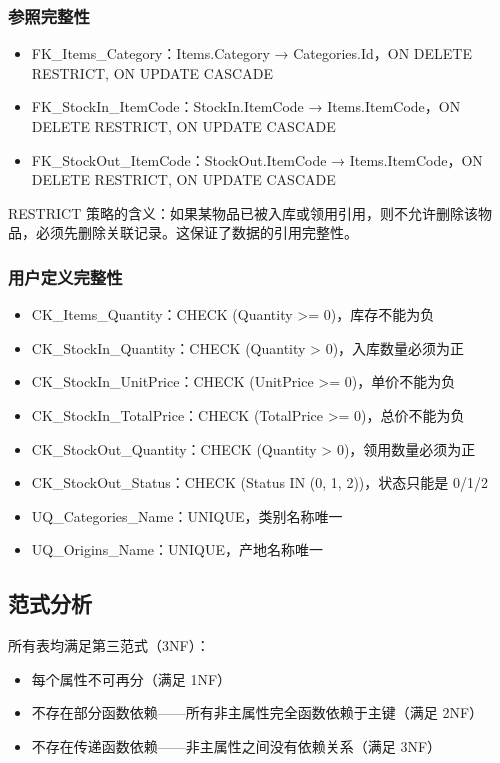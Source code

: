 \documentclass[12pt,a4paper]{ctexart}
\begin{document}
\subsubsection{参照完整性}

\begin{itemize}
    \item FK\_Items\_Category：Items.Category → Categories.Id，ON DELETE RESTRICT, ON UPDATE CASCADE
    \item FK\_StockIn\_ItemCode：StockIn.ItemCode → Items.ItemCode，ON DELETE RESTRICT, ON UPDATE CASCADE
    \item FK\_StockOut\_ItemCode：StockOut.ItemCode → Items.ItemCode，ON DELETE RESTRICT, ON UPDATE CASCADE
\end{itemize}

RESTRICT 策略的含义：如果某物品已被入库或领用引用，则不允许删除该物品，必须先删除关联记录。这保证了数据的引用完整性。

\subsubsection{用户定义完整性}

\begin{itemize}
    \item CK\_Items\_Quantity：CHECK (Quantity >= 0)，库存不能为负
    \item CK\_StockIn\_Quantity：CHECK (Quantity > 0)，入库数量必须为正
    \item CK\_StockIn\_UnitPrice：CHECK (UnitPrice >= 0)，单价不能为负
    \item CK\_StockIn\_TotalPrice：CHECK (TotalPrice >= 0)，总价不能为负
    \item CK\_StockOut\_Quantity：CHECK (Quantity > 0)，领用数量必须为正
    \item CK\_StockOut\_Status：CHECK (Status IN (0, 1, 2))，状态只能是 0/1/2
    \item UQ\_Categories\_Name：UNIQUE，类别名称唯一
    \item UQ\_Origins\_Name：UNIQUE，产地名称唯一
\end{itemize}

\subsection{范式分析}

所有表均满足第三范式（3NF）：

\begin{itemize}
    \item 每个属性不可再分（满足 1NF）
    \item 不存在部分函数依赖——所有非主属性完全函数依赖于主键（满足 2NF）
    \item 不存在传递函数依赖——非主属性之间没有依赖关系（满足 3NF）
\end{itemize}
\end{document}
